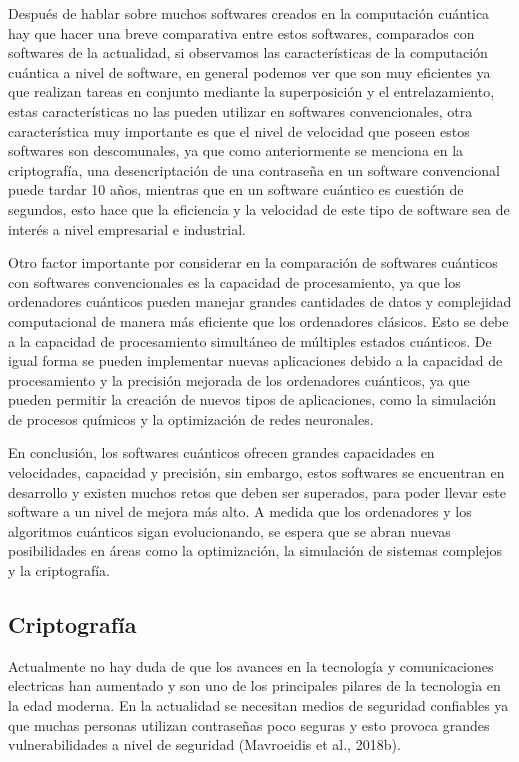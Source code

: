 \documentclass{article}
\begin{document}
Después de hablar sobre muchos softwares creados en la computación cuántica hay que hacer una breve comparativa entre estos softwares, comparados con softwares de la actualidad, si observamos las características de la computación cuántica a nivel de software, en general podemos ver que son muy eficientes ya que realizan tareas en conjunto mediante la superposición y el entrelazamiento, estas características no las pueden utilizar en softwares convencionales, otra característica muy importante es que el nivel de velocidad que poseen estos softwares son descomunales, ya que como anteriormente se menciona en la criptografía, una desencriptación de una contraseña en un software convencional puede tardar 10 años, mientras que en un software cuántico es cuestión de segundos, esto hace que la eficiencia y la velocidad de este tipo de software sea de interés a nivel empresarial e industrial. 

Otro factor importante por considerar en la comparación de softwares cuánticos con softwares convencionales es la capacidad de procesamiento, ya que los ordenadores cuánticos pueden manejar grandes cantidades de datos y complejidad computacional de manera más eficiente que los ordenadores clásicos. Esto se debe a la capacidad de procesamiento simultáneo de múltiples estados cuánticos. De igual forma se pueden implementar nuevas aplicaciones debido a la capacidad de procesamiento y la precisión mejorada de los ordenadores cuánticos, ya que pueden permitir la creación de nuevos tipos de aplicaciones, como la simulación de procesos químicos y la optimización de redes neuronales. 

En conclusión, los softwares cuánticos ofrecen grandes capacidades en velocidades, capacidad y precisión, sin embargo, estos softwares se encuentran en desarrollo y existen muchos retos que deben ser superados, para poder llevar este software a un nivel de mejora más alto. A medida que los ordenadores y los algoritmos cuánticos sigan evolucionando, se espera que se abran nuevas posibilidades en áreas como la optimización, la simulación de sistemas complejos y la criptografía. 

\subsection{Criptografía}
Actualmente no hay duda de que los avances en la tecnología y comunicaciones electricas han aumentado y son uno de los principales pilares de la tecnologia en la edad moderna. En la actualidad se necesitan medios de seguridad confiables ya que muchas personas utilizan contraseñas poco seguras y esto provoca grandes vulnerabilidades a nivel de seguridad (Mavroeidis et al., 2018b).
\end{document}
